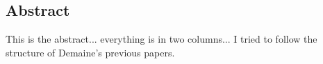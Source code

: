 \subsection*{Abstract}
This is the abstract... everything is in two columns... I tried to follow the structure of Demaine's previous papers.
